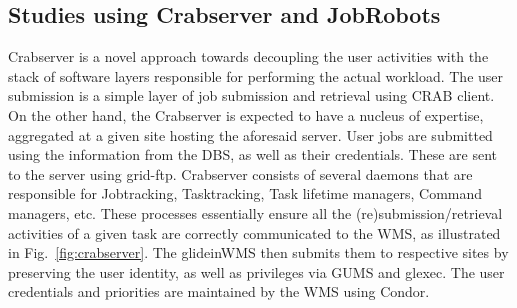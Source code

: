 \documentclass[a4paper]{jpconf}
\begin{document}
\subsection{Studies using Crabserver and JobRobots}
Crabserver is a novel approach towards decoupling the user activities with the stack of software
layers responsible for performing the actual workload. The user submission is a simple layer 
of job submission and retrieval using CRAB client. On the other hand, the Crabserver is expected 
to have a nucleus of expertise, aggregated at a given site hosting the aforesaid server. User jobs
are submitted using the information from the DBS, as well as their credentials.
These are sent to the server using grid-ftp. Crabserver consists of several daemons that are responsible 
for Jobtracking, Tasktracking, Task lifetime managers, Command managers, etc. These processes
essentially ensure all the (re)submission/retrieval activities of a given task are correctly communicated
to the WMS, as illustrated in Fig.~\ref{fig:crabserver}. The glideinWMS then submits them to respective sites 
by preserving the user identity, as well as privileges via GUMS and glexec. The user credentials
and priorities are maintained by the WMS using Condor.
\end{document}
